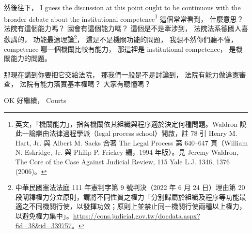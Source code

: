 \hypertarget{w06:cue:2186}{}然後往下，
\hypertarget{w06:cue:2187}{}I guess the discussion at this point
\hypertarget{w06:cue:2188}{}ought to be continuous with the broader debate
\hypertarget{w06:cue:2189}{}about the institutional competence\footnote{英文，「機關能力」，指各機關依其組織與程序適於決定何種問題。Waldron 說此一論辯由法律過程學派（legal process school）開啟，註 78 引 Henry M. Hart, Jr. 與 Albert M. Sacks 合著 The Legal Process 第 640–647 頁（William N. Eskridge, Jr. 與 Philip P. Frickey 編，1994 年版）。見 Jeremy Waldron, The Core of the Case Against Judicial Review, 115 Yale L.J. 1346, 1376 (2006)。}
\hypertarget{w06:cue:2190}{}這個常常看到，
\hypertarget{w06:cue:2191}{}什麼意思？
\hypertarget{w06:cue:2192}{}法院有這個能力嗎？
\hypertarget{w06:cue:2193}{}國會有這個能力嗎？
\hypertarget{w06:cue:2194}{}這個是不是牽涉到，
\hypertarget{w06:cue:2195}{}法院法系德國人喜歡講的，
\hypertarget{w06:cue:2196}{}功能最適理論\footnote{中華民國憲法法庭 111 年憲判字第 9 號判決（2022 年 6 月 24 日）理由第 20 段闡釋權力分立原則，謂將不同性質之權力「分別歸屬於組織及程序等功能最適之不同機關行使，以發揮功效；原則上並禁止同一機關行使兩種以上權力，以避免權力集中」。\url{https://cons.judicial.gov.tw/docdata.aspx?fid=38&id=339757}。}，
\hypertarget{w06:cue:2197}{}這是不是機關功能的問題，
\hypertarget{w06:cue:2198}{}我想不然你們聽不懂，
\hypertarget{w06:cue:2199}{}competence
\hypertarget{w06:cue:2200}{}哪一個機關比較有能力，
\hypertarget{w06:cue:2201}{}那這裡是 institutional competence，
\hypertarget{w06:cue:2202}{}是機關能力的問題。

\hypertarget{w06:cue:2203}{}那現在講到你要把它交給法院，
\hypertarget{w06:cue:2204}{}那我們一般是不是討論到，
\hypertarget{w06:cue:2205}{}法院有能力做違憲審查，
\hypertarget{w06:cue:2206}{}法院有能力落實基本權嗎？
\hypertarget{w06:cue:2207}{}大家有聽懂嗎？

\hypertarget{w06:cue:2208}{}OK 好繼續，
\hypertarget{w06:cue:2209}{}Courts

